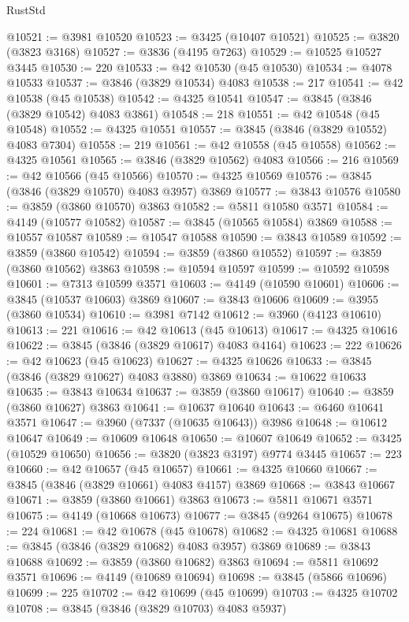 \begin{lexlean}{RustStd}
\begin{coremodule}
@10521 := @3981 @10520
@10523 := @3425 (@10407 @10521)
@10525 := @3820 (@3823 @3168)
@10527 := @3836 (@4195 @7263)
@10529 := @10525 @10527 @3445
@10530 := 220
@10533 := @42 @10530 (@45 @10530)
@10534 := @4078 @10533
@10537 := @3846 (@3829 @10534) @4083
@10538 := 217
@10541 := @42 @10538 (@45 @10538)
@10542 := @4325 @10541
@10547 := @3845 (@3846 (@3829 @10542) @4083 @3861)
@10548 := 218
@10551 := @42 @10548 (@45 @10548)
@10552 := @4325 @10551
@10557 := @3845 (@3846 (@3829 @10552) @4083 @7304)
@10558 := 219
@10561 := @42 @10558 (@45 @10558)
@10562 := @4325 @10561
@10565 := @3846 (@3829 @10562) @4083
@10566 := 216
@10569 := @42 @10566 (@45 @10566)
@10570 := @4325 @10569
@10576 := @3845 (@3846 (@3829 @10570) @4083 @3957) @3869
@10577 := @3843 @10576
@10580 := @3859 (@3860 @10570) @3863
@10582 := @5811 @10580 @3571
@10584 := @4149 (@10577 @10582)
@10587 := @3845 (@10565 @10584) @3869
@10588 := @10557 @10587
@10589 := @10547 @10588
@10590 := @3843 @10589
@10592 := @3859 (@3860 @10542)
@10594 := @3859 (@3860 @10552)
@10597 := @3859 (@3860 @10562) @3863
@10598 := @10594 @10597
@10599 := @10592 @10598
@10601 := @7313 @10599 @3571
@10603 := @4149 (@10590 @10601)
@10606 := @3845 (@10537 @10603) @3869
@10607 := @3843 @10606
@10609 := @3955 (@3860 @10534)
@10610 := @3981 @7142
@10612 := @3960 (@4123 @10610)
@10613 := 221
@10616 := @42 @10613 (@45 @10613)
@10617 := @4325 @10616
@10622 := @3845 (@3846 (@3829 @10617) @4083 @4164)
@10623 := 222
@10626 := @42 @10623 (@45 @10623)
@10627 := @4325 @10626
@10633 := @3845 (@3846 (@3829 @10627) @4083 @3880) @3869
@10634 := @10622 @10633
@10635 := @3843 @10634
@10637 := @3859 (@3860 @10617)
@10640 := @3859 (@3860 @10627) @3863
@10641 := @10637 @10640
@10643 := @6460 @10641 @3571
@10647 := @3960 (@7337 (@10635 @10643)) @3986
@10648 := @10612 @10647
@10649 := @10609 @10648
@10650 := @10607 @10649
@10652 := @3425 (@10529 @10650)
@10656 := @3820 (@3823 @3197) @9774 @3445
@10657 := 223
@10660 := @42 @10657 (@45 @10657)
@10661 := @4325 @10660
@10667 := @3845 (@3846 (@3829 @10661) @4083 @4157) @3869
@10668 := @3843 @10667
@10671 := @3859 (@3860 @10661) @3863
@10673 := @5811 @10671 @3571
@10675 := @4149 (@10668 @10673)
@10677 := @3845 (@9264 @10675)
@10678 := 224
@10681 := @42 @10678 (@45 @10678)
@10682 := @4325 @10681
@10688 := @3845 (@3846 (@3829 @10682) @4083 @3957) @3869
@10689 := @3843 @10688
@10692 := @3859 (@3860 @10682) @3863
@10694 := @5811 @10692 @3571
@10696 := @4149 (@10689 @10694)
@10698 := @3845 (@5866 @10696)
@10699 := 225
@10702 := @42 @10699 (@45 @10699)
@10703 := @4325 @10702
@10708 := @3845 (@3846 (@3829 @10703) @4083 @5937)

\end{coremodule}
\end{lexlean}
